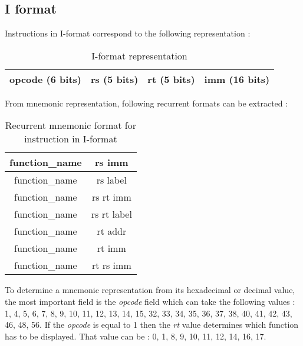 \subsection*{I format}

	Instructions in I-format correspond to the following representation : 
	\begin{table}[H]
		\centering
		\begin{tabular}{|c|c|c|c|}
		\hline 
		opcode (6 bits) & rs (5 bits) & rt (5 bits) & imm (16 bits) \\ 
		\hline 
		\end{tabular} 
		\caption{I-format representation}
	\end{table}
	
	From mnemonic representation, following recurrent formats can be extracted : 
	\begin{table}[H]
		\centering
		\begin{tabular}{|c|c|}
		\hline 
		function\_name & rs imm\\ 
		\hline 
		function\_name & rs label\\ 
		\hline 
		function\_name & rs rt imm\\ 
		\hline 
		function\_name & rs rt label\\ 
		\hline 
		function\_name & rt addr \\ 
		\hline 
		function\_name & rt imm \\ 
		\hline 
		function\_name & rt rs imm \\ 
		\hline 
		\end{tabular} 
		\caption{Recurrent mnemonic format for instruction in I-format}
	\end{table}
	
	To determine a mnemonic representation from its hexadecimal or decimal value, the most important field is the \textit{opcode}  field which can take the following values : 1, 4, 5, 6, 7, 8, 9, 10, 11, 12, 13, 14, 15, 32, 33, 34, 35, 36, 37, 38, 40, 41, 42, 43, 46, 48, 56. If the \textit{opcode} is equal to 1 then the \textit{rt} value determines which function has to be displayed. That value can be : 0, 1, 8, 9, 10, 11, 12, 14, 16, 17.